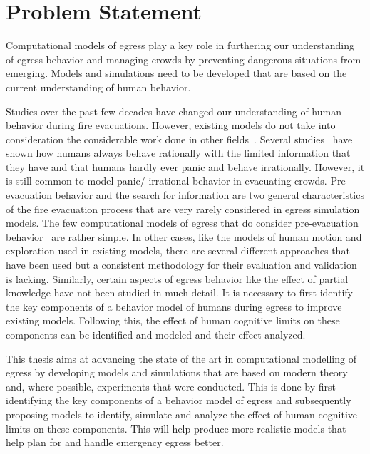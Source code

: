 
\section{Problem Statement}
\label{Intro:ProblemStatement}

Computational models of egress play a key role in furthering our understanding of egress behavior and managing crowds by preventing dangerous situations from emerging. Models and simulations need to be developed that are based on the current understanding of human behavior.

Studies over the past few decades have changed our understanding of human behavior during fire evacuations. However, existing models do not take into consideration the considerable work done in other fields~\cite{Aguirre:2004tn}. Several studies~\cite{Kobes:2009jx,Schadschneider:2008cz,Reicher:2008ep,Torres:2010tj,Paulsen:1984ti,Sime:1983uy} have shown how humans always behave rationally with the limited information that they have and that humans hardly ever panic and behave irrationally.
  However, it is still common to model panic/ irrational behavior in evacuating crowds. Pre-evacuation behavior and the search for information are two general characteristics of the fire evacuation process that are very rarely considered in egress simulation models. The few computational models of egress that do consider pre-evacuation behavior~\cite{Pires:2005gs,Klupfel:2003waa} are rather simple. In other cases, like the models of human motion and exploration used in existing models, there are several different approaches that have been used but a consistent methodology for their evaluation and validation is lacking. Similarly, certain aspects of egress behavior like the effect of partial knowledge have not been studied in much detail. It is necessary to first identify the key components of a behavior model of humans during egress to improve existing models. Following this, the effect of human cognitive limits on these components can be identified and modeled and their effect analyzed.

This thesis aims at advancing the state of the art in computational modelling of egress by developing models and simulations that are based on modern theory and, where possible, experiments that were conducted. This is done by first identifying the key components of a behavior model of egress and subsequently proposing models to identify, simulate and analyze the effect of human cognitive limits on these components. This will help produce more realistic models that help plan for and handle emergency egress better.


